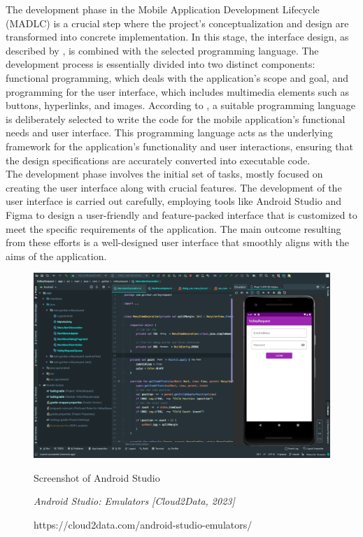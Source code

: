 The development phase in the Mobile Application Development Lifecycle (MADLC) is a crucial step where the project's conceptualization and design are transformed into concrete implementation. In this stage, the interface design, as described by \textcite{shanmugam19}, is combined with the selected programming language. The development process is essentially divided into two distinct components: functional programming, which deals with the application's scope and goal, and programming for the user interface, which includes multimedia elements such as buttons, hyperlinks, and images. According to \textcite{wambua23}, a suitable programming language is deliberately selected to write the code for the mobile application's functional needs and user interface. This programming language acts as the underlying framework for the application's functionality and user interactions, ensuring that the design specifications are accurately converted into executable code. \\

The development phase involves the initial set of tasks, mostly focused on creating the user interface along with crucial features. The development of the user interface is carried out carefully, employing tools like Android Studio and Figma to design a user-friendly and feature-packed interface that is customized to meet the specific requirements of the application. The main outcome resulting from these efforts is a well-designed user interface that smoothly aligns with the aims of the application. \\

\begin{figure}[h]
    \centering
    \includegraphics[width=0.9\linewidth]{mainmatter/images/ssandroidstudio.png}
	\caption{Screenshot of Android Studio}
    \caption*{\textit{Android Studio: Emulators [Cloud2Data, 2023]}}
    \caption*{https://cloud2data.com/android-studio-emulators/}
    \label{fig:myfig39}
\end{figure}


